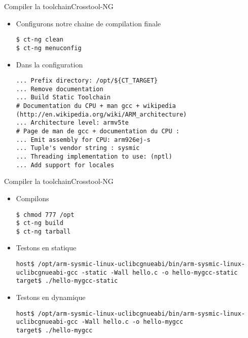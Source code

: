 \begin{frame}[fragile=singleslide]{Compiler la toolchain}{Crosstool-NG}
  \begin{itemize}
  \item Configurons notre chaine de compilation finale
    \begin{lstlisting}
$ ct-ng clean 
$ ct-ng menuconfig
       \end{lstlisting}
     \item Dans la configuration
       \begin{lstlisting}
... Prefix directory: /opt/${CT_TARGET}
... Remove documentation 
... Build Static Toolchain
# Documentation du CPU + man gcc + wikipedia (http://en.wikipedia.org/wiki/ARM_architecture)
... Architecture level: armv5te
# Page de man de gcc + documentation du CPU :
... Emit assembly for CPU: arm926ej-s
... Tuple's vendor string : sysmic
... Threading implementation to use: (nptl) 
... Add support for locales
       \end{lstlisting}
  \end{itemize}
\end{frame}

\begin{frame}[fragile=singleslide]{Compiler la toolchain}{Crosstool-NG}
  \begin{itemize}
     \item Compilons
       \begin{lstlisting}
$ chmod 777 /opt
$ ct-ng build
$ ct-ng tarball
       \end{lstlisting}
     \item Testons en statique
       \begin{lstlisting}[basicstyle=\ttfamily\scriptsize\color{colBasic}]
host$ /opt/arm-sysmic-linux-uclibcgnueabi/bin/arm-sysmic-linux-uclibcgnueabi-gcc -static -Wall hello.c -o hello-mygcc-static
target$ ./hello-mygcc-static
       \end{lstlisting}
     \item Testons en dynamique
       \begin{lstlisting}[basicstyle=\ttfamily\scriptsize\color{colBasic}]
host$ /opt/arm-sysmic-linux-uclibcgnueabi/bin/arm-sysmic-linux-uclibcgnueabi-gcc -Wall hello.c -o hello-mygcc
target$ ./hello-mygcc
	\end{lstlisting}
  \end{itemize}
\end{frame}

